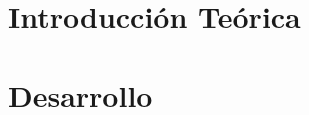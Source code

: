 \documentclass[12pt, a4paper]{report}
\begin{document}


\tableofcontents{}

\chapter{Introducción Teórica} 


\chapter{Desarrollo}

\end{document}
